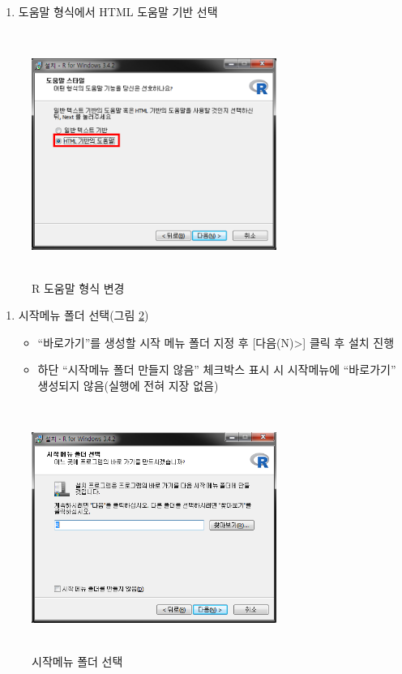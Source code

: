 \documentclass[12pt,a4paper]{book}
\providecommand{\tightlist}{%
  \setlength{\itemsep}{0pt}\setlength{\parskip}{0pt}}
\theoremstyle{definition}
\theoremstyle{definition}
\theoremstyle{definition}
\theoremstyle{remark}
\begin{document}
\begin{enumerate}
\def\labelenumi{\arabic{enumi}.}
\setcounter{enumi}{12}
\tightlist
\item
  도움말 형식에서 HTML 도움말 기반 선택
\end{enumerate}

\begin{figure}[H]
{
  \centering
  \includegraphics[width = 8cm, height = 8cm]{Figures/R-install-F07.png}
  \caption[R 도움말 형식 변경]{R 도움말 형식 변경}\label{fig:R-install-12}
}
\end{figure}

\begin{enumerate}
\def\labelenumi{\arabic{enumi}.}
\setcounter{enumi}{13}
\tightlist
\item
  시작메뉴 폴더 선택(그림 \ref{fig:R-install-13})

  \begin{itemize}
  \tightlist
  \item
    ``바로가기''를 생성할 시작 메뉴 폴더 지정 후
    {[}다음(N)\textgreater{}{]} 클릭 후 설치 진행
  \item
    하단 ``시작메뉴 폴더 만들지 않음'' 체크박스 표시 시 시작메뉴에
    ``바로가기'' 생성되지 않음(실행에 전혀 지장 없음)
  \end{itemize}
\end{enumerate}

\begin{figure}[H]
{
  \centering
  \includegraphics[width = 8cm, height = 8cm]{Figures/R-install-F08.png}
  \caption[시작메뉴 폴더 선택]{시작메뉴 폴더 선택}\label{fig:R-install-13}
}
\end{figure}
\end{document}
